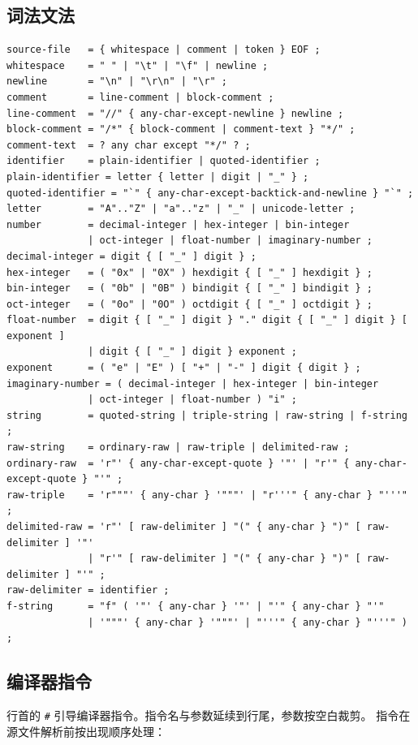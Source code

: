 \documentclass[UTF8,12pt]{ctexart}
\begin{document}
\subsection{词法文法}

\begin{lstlisting}
source-file   = { whitespace | comment | token } EOF ;
whitespace    = " " | "\t" | "\f" | newline ;
newline       = "\n" | "\r\n" | "\r" ;
comment       = line-comment | block-comment ;
line-comment  = "//" { any-char-except-newline } newline ;
block-comment = "/*" { block-comment | comment-text } "*/" ;
comment-text  = ? any char except "*/" ? ;
identifier    = plain-identifier | quoted-identifier ;
plain-identifier = letter { letter | digit | "_" } ;
quoted-identifier = "`" { any-char-except-backtick-and-newline } "`" ;
letter        = "A".."Z" | "a".."z" | "_" | unicode-letter ;
number        = decimal-integer | hex-integer | bin-integer
              | oct-integer | float-number | imaginary-number ;
decimal-integer = digit { [ "_" ] digit } ;
hex-integer   = ( "0x" | "0X" ) hexdigit { [ "_" ] hexdigit } ;
bin-integer   = ( "0b" | "0B" ) bindigit { [ "_" ] bindigit } ;
oct-integer   = ( "0o" | "0O" ) octdigit { [ "_" ] octdigit } ;
float-number  = digit { [ "_" ] digit } "." digit { [ "_" ] digit } [ exponent ]
              | digit { [ "_" ] digit } exponent ;
exponent      = ( "e" | "E" ) [ "+" | "-" ] digit { digit } ;
imaginary-number = ( decimal-integer | hex-integer | bin-integer
              | oct-integer | float-number ) "i" ;
string        = quoted-string | triple-string | raw-string | f-string ;
raw-string    = ordinary-raw | raw-triple | delimited-raw ;
ordinary-raw  = 'r"' { any-char-except-quote } '"' | "r'" { any-char-except-quote } "'" ;
raw-triple    = 'r"""' { any-char } '"""' | "r'''" { any-char } "'''" ;
delimited-raw = 'r"' [ raw-delimiter ] "(" { any-char } ")" [ raw-delimiter ] '"'
              | "r'" [ raw-delimiter ] "(" { any-char } ")" [ raw-delimiter ] "'" ;
raw-delimiter = identifier ;
f-string      = "f" ( '"' { any-char } '"' | "'" { any-char } "'"
              | '"""' { any-char } '"""' | "'''" { any-char } "'''" ) ;
\end{lstlisting}

\subsection{编译器指令}

行首的 \texttt{\#} 引导编译器指令。指令名与参数延续到行尾，参数按空白裁剪。
指令在源文件解析前按出现顺序处理：
\end{document}
